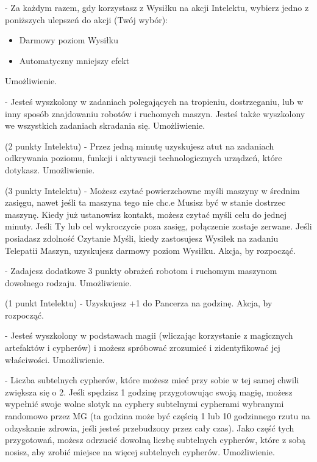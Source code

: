 { - Za każdym razem, gdy korzystasz z Wysiłku na akcji Intelektu, wybierz jedno z poniższych ulepszeń do akcji (Twój wybór):
\begin{itemize}
\item Darmowy poziom Wysiłku
\item Automatyczny mniejszy efekt
\end{itemize}
Umożliwienie. 

 - Jesteś wyszkolony w zadaniach polegających na tropieniu, dostrzeganiu, lub w inny sposób znajdowaniu robotów i ruchomych maszyn. Jesteś także wyszkolony we wszystkich zadaniach skradania się. Umożliwienie. 

 (2 punkty Intelektu) - Przez jedną minutę uzyskujesz atut na zadaniach odkrywania poziomu, funkcji i aktywacji technologicznych urządzeń, które dotykasz. Umożliwienie. 

 (3 punkty Intelektu) - Możesz czytać powierzchowne myśli maszyny w średnim zasięgu, nawet jeśli ta maszyna tego nie chc.e Musisz być w stanie dostrzec maszynę. Kiedy już ustanowisz kontakt, możesz czytać myśli celu do jednej minuty. Jeśli Ty lub cel wykroczycie poza zasięg, połączenie zostaje zerwane. Jeśli posiadasz zdolność Czytanie Myśli, kiedy zastosujesz Wysiłek na zadaniu Telepatii Maszyn, uzyskujesz darmowy poziom Wysiłku. Akcja, by rozpocząć. 

 - Zadajesz dodatkowe 3 punkty obrażeń robotom i ruchomym maszynom dowolnego rodzaju. Umożliwienie. 

 (1 punkt Intelektu) - Uzyskujesz +1 do Pancerza na godzinę. Akcja, by rozpocząć. 

 - Jesteś wyszkolony w podstawach magii (wliczając korzystanie z magicznych artefaktów i cypherów) i możesz spróbować zrozumieć i zidentyfikować jej właściwości. Umożliwienie. 

 - Liczba subtelnych cypherów, które możesz mieć przy sobie w tej samej chwili zwiększa się o 2. Jeśli spędzisz 1 godzinę przygotowując swoją magię, możesz wypełnić swoje wolne slotyk na cyphery subtelnymi cypherami wybranymi randomowo przez MG (ta godzina może być częścią 1 lub 10 godzinnego rzutu na odzyskanie zdrowia, jeśli jesteś przebudzony przez cały czas). Jako część tych przygotowań, możesz odrzucić dowolną liczbę subtelnych cypherów, które z sobą nosisz, aby zrobić miejsce na więcej subtelnych cypherów. Umożliwienie. 

}
